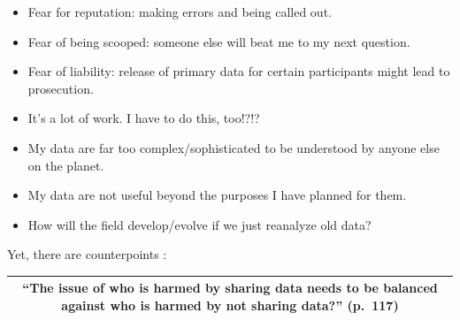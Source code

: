 \documentclass[
  english,
]{book}
\providecommand{\tightlist}{%
  \setlength{\itemsep}{0pt}\setlength{\parskip}{0pt}}
\begin{document}
\begin{itemize}
\tightlist
\item
  Fear for reputation: making errors and being called out.
\item
  Fear of being scooped: someone else will beat me to my next question.
\item
  Fear of liability: release of primary data for certain participants might lead to prosecution.
\item
  It's a lot of work. I have to do this, too!?!?
\item
  My data are far too complex/sophisticated to be understood by anyone else on the planet.
\item
  My data are not useful beyond the purposes I have planned for them.
\item
  How will the field develop/evolve if we just reanalyze old data?
\end{itemize}

Yet, there are counterpoints \citep{martone_data_2018}:

\begin{longtable}[]{@{}c@{}}
\toprule
\begin{minipage}[b]{0.97\columnwidth}\centering
``The issue of who is harmed by sharing data needs to be balanced against who is harmed by not sharing data?'' (p.~117)\strut
\end{minipage}\tabularnewline
\midrule
\endhead
\bottomrule
\end{longtable}
\end{document}

